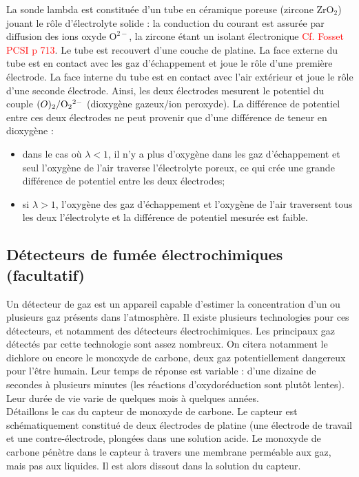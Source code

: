 \documentclass[11pt,a4paper]{report}
\begin{document}
La sonde lambda est constituée d'un tube en céramique poreuse (zircone $\text{ZrO}_2$) jouant le rôle d'électrolyte solide : la conduction du courant est assurée par diffusion des ions oxyde $\text{O}^{2-}$, la zircone étant un isolant électronique \textcolor{red}{Cf. Fosset PCSI p 713}. Le tube est recouvert d'une couche de platine. La face externe du tube est en contact avec les gaz d'échappement et joue le rôle d'une première électrode. La face interne du tube est en contact avec l'air extérieur et joue le rôle d'une seconde électrode. Ainsi, les deux électrodes mesurent le potentiel du couple $\text(O)_2/\text{O}_2{}^{2-}$ (dioxygène gazeux/ion peroxyde). La différence de potentiel entre ces deux électrodes ne peut provenir que d'une différence de teneur en dioxygène :
\begin{itemize}
	\item dans le cas où $\lambda < 1$, il n'y a plus d'oxygène dans les gaz d'échappement et seul l'oxygène de l'air traverse l'électrolyte poreux, ce qui crée une grande différence de potentiel entre les deux électrodes;
	\item si $\lambda > 1$, l'oxygène des gaz d'échappement et l'oxygène de l'air traversent tous les deux l'électrolyte et la différence de potentiel mesurée est faible.
\end{itemize}

\subsection{Détecteurs de fumée électrochimiques (facultatif)}

Un détecteur de gaz est un appareil capable d'estimer la concentration d'un ou plusieurs gaz présents dans l'atmosphère. Il existe plusieurs technologies pour ces détecteurs, et notamment des détecteurs électrochimiques. Les principaux gaz détectés par cette technologie sont assez nombreux. On citera notamment le dichlore ou encore le monoxyde de carbone, deux gaz potentiellement dangereux pour l'être humain. Leur temps de réponse est variable : d'une dizaine de secondes à plusieurs minutes (les réactions d'oxydoréduction sont plutôt lentes). Leur durée de vie varie de quelques mois à quelques années.\\

Détaillons le cas du capteur de monoxyde de carbone. Le capteur est schématiquement constitué de deux électrodes de platine (une électrode de travail et une contre-électrode, plongées dans une solution acide. Le monoxyde de carbone pénètre dans le capteur à travers une membrane perméable aux gaz, mais pas aux liquides. Il est alors dissout dans la solution du capteur.\\
\end{document}
